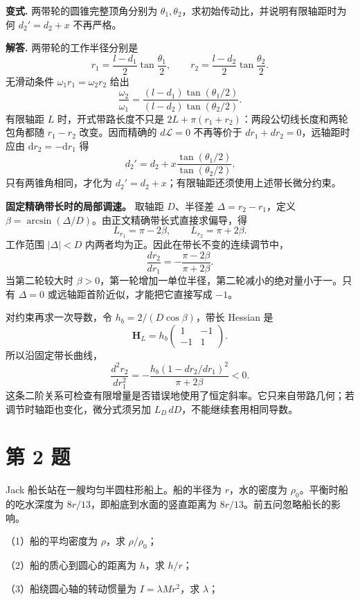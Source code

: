 \documentclass[12pt,a4paper,UTF8]{ctexart}
\begin{document}
\textbf{变式.} 两带轮的圆锥完整顶角分别为
\(\theta_1,\theta_2\)，求初始传动比，并说明有限轴距时为何 \(d_2'=d_2+x\)
不再严格。

\textbf{解答.} 两带轮的工作半径分别是 \[
r_1=\frac{l-d_1}{2}\tan\frac{\theta_1}{2},
\qquad
r_2=\frac{l-d_2}{2}\tan\frac{\theta_2}{2}.
\] 无滑动条件 \(\omega_1r_1=\omega_2r_2\) 给出 \[
\boxed{
\frac{\omega_2}{\omega_1}=
\frac{(l-d_1)\tan(\theta_1/2)}
{(l-d_2)\tan(\theta_2/2)}}.
\] 有限轴距 \(L\) 时，开式带路长度不只是
\(2L+\pi(r_1+r_2)\)：两段公切线长度和两轮包角都随 \(r_1-r_2\)
改变。因而精确的 \(d\mathcal L=0\) 不再等价于
\(dr_1+dr_2=0\)，远轴距时应由 \(\mathrm dr_2=-\mathrm dr_1\) 得 \[
d_2'=d_2+x\frac{\tan(\theta_1/2)}{\tan(\theta_2/2)}.
\] 只有两锥角相同，才化为
\(d_2'=d_2+x\)；有限轴距还须使用上述带长微分约束。

\textbf{固定精确带长时的局部调速。} 取轴距 \(D\)、半径差
\(\Delta=r_2-r_1\)，定义
\(\beta=\arcsin(\Delta/D)\)。由正文精确带长式直接求偏导，得 \[
L_{r_1}=\pi-2\beta,\qquad L_{r_2}=\pi+2\beta.
\] 工作范围 \(|\Delta|<D\) 内两者均为正。因此在带长不变的连续调节中， \[
\frac{dr_2}{dr_1}=-\frac{\pi-2\beta}{\pi+2\beta}.
\] 当第二轮较大时
\(\beta>0\)，第一轮增加一单位半径，第二轮减小的绝对量小于一。只有
\(\Delta=0\) 或远轴距首阶近似，才能把它直接写成 \(-1\)。

对约束再求一次导数，令 \(h_b=2/(D\cos\beta)\)，带长 Hessian 是 \[
\bm H_L=h_b\begin{pmatrix}1&-1\\-1&1\end{pmatrix}.
\] 所以沿固定带长曲线， \[
\frac{d^2r_2}{dr_1^2}
=-\frac{h_b(1-dr_2/dr_1)^2}{\pi+2\beta}<0.
\]
这条二阶关系可检查有限增量是否错误地使用了恒定斜率。它只来自带路几何；若调节时轴距也变化，微分式须另加
\(L_D\,dD\)，不能继续套用相同导数。

\newpage

\section{第 2 题}\label{ux7b2c-2-ux9898}

Jack 船长站在一艘均匀半圆柱形船上。船的半径为 \(r\)，水的密度为
\(\rho_0\)。平衡时船的吃水深度为 \(8r/13\)，即船底到水面的竖直距离为
\(8r/13\)。前五问忽略船长的影响。

（1）船的平均密度为 \(\rho\)，求 \(\rho/\rho_0\)；

（2）船的质心到圆心的距离为 \(h\)，求 \(h/r\)；

（3）船绕圆心轴的转动惯量为 \(I=\lambda Mr^2\)，求 \(\lambda\)；
\end{document}
